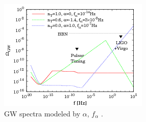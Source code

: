 \documentclass[11pt,a4paper,twoside]{book}
\begin{document}
\begin{figure}[h]
	\centering
	\includegraphics[width=0.7\linewidth, height=0.3\textheight]{Images/Chap3/Kurojanagi_Takahashi_Fig7}
	\caption{GW spectra modeled by $ \alpha $, $ f_{\alpha} $ \cite{Chap3:BlueTiltedSpectrum}.}
	\label{fig:kurojanagitakahashifig7}
\end{figure}
\end{document}
